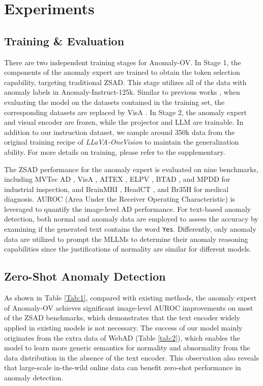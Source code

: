 \section{Experiments}
\subsection{Training \& Evaluation}
There are two independent training stages for Anomaly-OV. In Stage 1, the components of the anomaly expert are trained to obtain the token selection capability, targeting traditional ZSAD. This stage utilizes all of the data with anomaly labels in Anomaly-Instruct-125k. Similar to previous works \cite{zhou2024anomalyclip, cao2025adaclip}, when evaluating the model on the datasets contained in the training set, the corresponding datasets are replaced by VisA \cite{visa}. In Stage 2, the anomaly expert and visual encoder are frozen, while the projector and LLM are trainable. In addition to our instruction dataset, we sample around 350k data from the original training recipe of \textit{LLaVA-OneVision} to maintain the generalization ability. For more details on training, please refer to the supplementary.

The ZSAD performance for the anomaly expert is evaluated on nine benchmarks, including MVTec AD \cite{mvtec}, VisA \cite{visa}, AITEX \cite{aitex}, ELPV \cite{elpv}, BTAD \cite{btad}, and MPDD \cite{mpdd} for industrial inspection, and BrainMRI \cite{brainmri}, HeadCT \cite{headct}, and Br35H \cite{Br35h} for medical diagnosis. AUROC (Area Under the Receiver Operating Characteristic) is leveraged to quantify the image-level AD performance. For text-based anomaly detection, both normal and anomaly data are employed to assess the accuracy by examining if the generated text contains the word \texttt{Yes}. Differently, only anomaly data are utilized to prompt the MLLMs to determine their anomaly reasoning capabilities since the justifications of normality are similar for different models.


\subsection{Zero-Shot Anomaly Detection}

As shown in Table \ref{Tab:1}, compared with existing methods, the anomaly expert of Anomaly-OV achieves significant image-level AUROC improvements on most of the ZSAD benchmarks, which demonstrates that the text encoder widely applied in existing models is not necessary. The success of our model mainly originates from the extra data of WebAD (Table \ref{tab:2}), which enables the model to learn more generic semantics for normality and abnormality from the data distribution in the absence of the text encoder. This observation also reveals that large-scale in-the-wild online data can benefit zero-shot performance in anomaly detection. 

